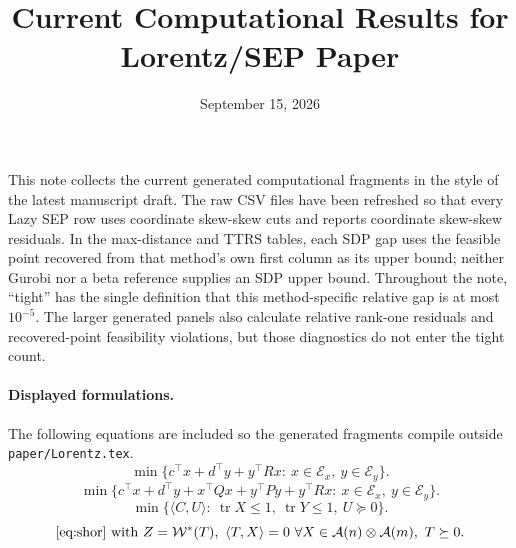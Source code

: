 \documentclass[11pt]{article}
\title{Current Computational Results for Lorentz/SEP Paper}
\author{}
\date{September 15, 2026}
\providecommand{\Ecal}{\mathcal{E}}
\begin{document}
\maketitle

\noindent This note collects the current generated computational fragments in
the style of the latest manuscript draft.  The raw CSV files have been
refreshed so that every Lazy SEP row uses coordinate skew-skew cuts and reports
coordinate skew-skew residuals.  In the max-distance and TTRS tables, each SDP
gap uses the feasible point recovered from that method's own first column as
its upper bound; neither Gurobi nor a beta reference supplies an SDP upper
bound.  Throughout the note, ``tight'' has the single definition that this
method-specific relative gap is at most \(10^{-5}\).  The larger generated
panels also calculate relative rank-one residuals and recovered-point
feasibility violations, but those diagnostics do not enter the tight count.

\paragraph{Displayed formulations.}
The following equations are included so the generated fragments compile outside
\texttt{paper/Lorentz.tex}.
\begin{equation}
\label{eq:bilinear}
\min\{c^\top x+d^\top y+y^\top Rx:\ x\in\Ecal_x,\ y\in\Ecal_y\}.
\end{equation}
\begin{equation}
\label{eq:quadratic}
\min\{c^\top x+d^\top y+x^\top Qx+y^\top Py+y^\top Rx:\ x\in\Ecal_x,\ y\in\Ecal_y\}.
\end{equation}
\begin{equation}
\label{eq:shor}
\min\{\langle C,U\rangle:\ \operatorname{tr}X\le 1,\ \operatorname{tr}Y\le 1,\ U\succeq 0\}.
\end{equation}
\begin{equation}
\label{eq:fullsep}
\eqref{eq:shor}\ \text{with}\ Z=\mathcal{W}^*(T),\ \langle T,X\rangle=0\ \forall X\in\mathcal{A}(n)\otimes\mathcal{A}(m),\ T\succeq 0.
\end{equation}
\end{document}

